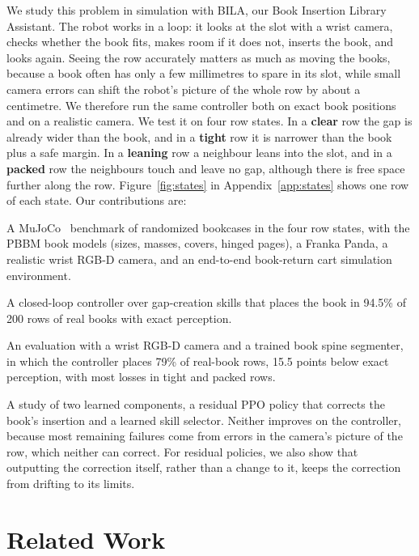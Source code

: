 \documentclass{article}
\begin{document}
We study this problem in simulation with BILA, our Book Insertion Library Assistant. The robot works in a loop: it looks at the slot with a wrist camera,
checks whether the book fits, makes room if it does not, inserts the book, and looks again. Seeing the row
accurately matters as much as moving the books, because a book often has only a few millimetres to spare in
its slot, while small camera errors can shift the robot's picture of the whole row by about a centimetre.
We therefore run the same controller both on exact book positions and on a realistic camera. We test it on four row states.
In a \textbf{clear} row the gap is already wider than the book, and in a \textbf{tight} row it is narrower
than the book plus a safe margin.
In a \textbf{leaning} row a neighbour leans into the slot, and in a \textbf{packed} row the neighbours touch
and leave no gap, although there is free space further along the row.
Figure~\ref{fig:states} in Appendix~\ref{app:states} shows one row of each state. Our contributions are:
\begin{compactenum}
  \item A MuJoCo~\citep{todorov2012mujoco} benchmark of randomized bookcases in the four row states, with the
        PBBM book models (sizes, masses, covers, hinged pages), a Franka Panda, a realistic wrist RGB-D camera, and an end-to-end book-return cart simulation environment.
  \item A closed-loop controller over gap-creation skills that places the book in 94.5\% of 200 rows of
        real books with exact perception.
  \item An evaluation with a wrist RGB-D camera and a trained book spine segmenter, in which the controller
        places 79\% of real-book rows, 15.5 points below exact perception, with most losses in tight and
        packed rows.
  \item A study of two learned components, a residual PPO policy that corrects the book's insertion
        and a learned skill selector. Neither improves on the controller,
        because most remaining failures come from errors in the camera's picture of the row, which neither
        can correct. For residual policies, we also show that outputting the correction itself, rather than
        a change to it, keeps the correction from drifting to its limits.
\end{compactenum}

\section{Related Work}
\end{document}

